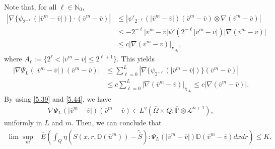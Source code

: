 \documentclass[reqno]{amsart}
\theoremstyle{definition}
\theoremstyle{remark}
\numberwithin{equation}{section} \allowdisplaybreaks
\begin{document}
Note that, for all $\ell\in \mathbb{N}_0$,
\begin{equation*}
\begin{split}
|\nabla\{\psi_{2^{-\ell}}(|\overline{v}^{m}-\overline{v}|)\}\cdot(\overline{v}^{m}-\overline{v})|&\leq|\psi'_{2^{-\ell}}(|\overline{v}^{m}-\overline{v}|)(\overline{v}^{m}-\overline{v})\otimes\nabla(\overline{v}^{m}-\overline{v})|\\
&\leq-2^{-\ell}|\overline{v}^{m}-\overline{v}|\psi'(2^{-\ell}|\overline{v}^{m}-\overline{v}|)|\nabla(\overline{v}^{m}-\overline{v})|\\
&\leq c|\nabla(\overline{v}^{m}-\overline{v})|_{\chi_{A_\ell}},
\end{split}
\end{equation*}
where $A_\ell:=\{2^\ell<|\overline{v}^{m}-\overline{v}|\leq
2^{\ell+1}\}$. This yields
\begin{equation*}
\begin{split}
|\nabla \Psi_L(|\overline{v}^{m}-\overline{v}|)(\overline{v}^{m}-\overline{v})|&\leq\sum_{\ell=0}^L|\nabla\{\psi_{2^{-\ell}}(|\overline{v}^{m}-\overline{v}|)\}(\overline{v}^{m}-\overline{v})|\\
&\leq
c\sum_{\ell=0}^L|\nabla(\overline{v}^{m}-\overline{v})|_{\chi_{A_\ell}}\leq
c|\nabla(\overline{v}^{m}-\overline{v})|.
\end{split}
\end{equation*}
By using \eqref{5.39} and \eqref{5.44}, we have
\begin{equation}\label{5.59}
\begin{split}
\nabla
\Psi_L(|\overline{v}^{m}-\overline{v}|)(\overline{v}^{m}-\overline{v})\in
L^q(\overline{\Omega}\times
Q;\overline{\mathbb{P}}\otimes\mathcal{L}^{n+1}),
\end{split}
\end{equation}
uniformly in $L$ and $m$. Then, we can  conclude that
\begin{equation}\label{5.60}
\begin{split}
\lim\sup_{m}&\overline{E}\left(\int_Q
\eta(S(x,r,\mathbb{D}(\overline{u}^m))-\tilde{\overline{S}}):
\Psi_L(|\overline{v}^{m}-\overline{v}|)\mathbb{D}(\overline{v}^{m}-\overline{v})dxdr\right)\leq
K.
\end{split}
\end{equation}
\end{document}
